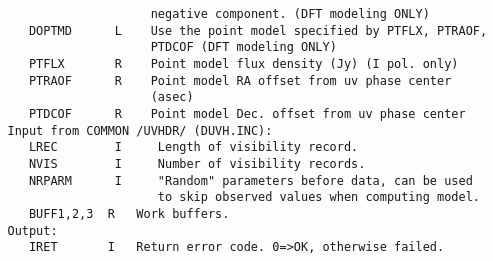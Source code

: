 \begin{verbatim}
                       negative component. (DFT modeling ONLY)
      DOPTMD      L    Use the point model specified by PTFLX, PTRAOF,
                       PTDCOF (DFT modeling ONLY)
      PTFLX       R    Point model flux density (Jy) (I pol. only)
      PTRAOF      R    Point model RA offset from uv phase center
                       (asec)
      PTDCOF      R    Point model Dec. offset from uv phase center
   Input from COMMON /UVHDR/ (DUVH.INC):
      LREC        I     Length of visibility record.
      NVIS        I     Number of visibility records.
      NRPARM      I     "Random" parameters before data, can be used
                        to skip observed values when computing model.
      BUFF1,2,3  R   Work buffers.
   Output:
      IRET       I   Return error code. 0=>OK, otherwise failed.
\end{verbatim}

